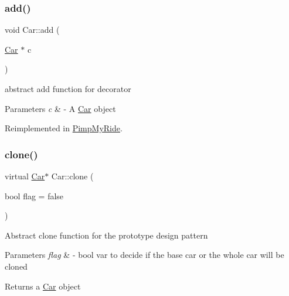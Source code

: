 \subsubsection{\texorpdfstring{add()}{add()}}
{\footnotesize\ttfamily void Car\+::add (\begin{DoxyParamCaption}\item[{\mbox{\hyperlink{class_car}{Car}} $\ast$}]{c }\end{DoxyParamCaption})\hspace{0.3cm}{\ttfamily [virtual]}}

abstract add function for decorator 
\begin{DoxyParams}{Parameters}
{\em c} & -\/ A \mbox{\hyperlink{class_car}{Car}} object \\
\hline
\end{DoxyParams}


Reimplemented in \mbox{\hyperlink{class_pimp_my_ride_a2293a4df894794145696d7610efe3056}{Pimp\+My\+Ride}}.

\mbox{\label{class_car_a27ad98735fd4a3f675234ea806c227da}} 
\subsubsection{\texorpdfstring{clone()}{clone()}}
{\footnotesize\ttfamily virtual \mbox{\hyperlink{class_car}{Car}}$\ast$ Car\+::clone (\begin{DoxyParamCaption}\item[{bool}]{flag = {\ttfamily false} }\end{DoxyParamCaption})\hspace{0.3cm}{\ttfamily [pure virtual]}}

Abstract clone function for the prototype design pattern 
\begin{DoxyParams}{Parameters}
{\em flag} & -\/ bool var to decide if the base car or the whole car will be cloned \\
\hline
\end{DoxyParams}
\begin{DoxyReturn}{Returns}
a \mbox{\hyperlink{class_car}{Car}} object 
\end{DoxyReturn}


